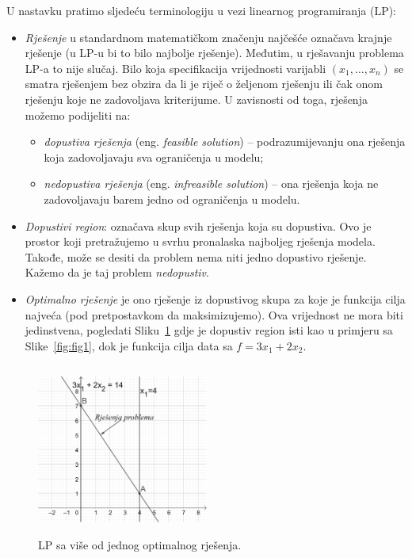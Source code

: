 \documentclass[a4paper, utf8, 11pt, colorlinks]{book}
\begin{document}
 U nastavku pratimo sljedeću terminologiju u vezi linearnog programiranja (LP):
\begin{itemize}
    \item \emph{Rješenje} u standardnom matematičkom značenju najčešće označava krajnje rješenje   (u LP-u bi to bilo najbolje rješenje). Međutim, u rješavanju problema LP-a to  nije slučaj. Bilo koja specifikacija vrijednosti varijabli  $(x_1,\ldots, x_n)$ se smatra rješenjem bez obzira da li je riječ o željenom rješenju ili čak onom rješenju koje ne zadovoljava kriterijume. U zavisnosti od toga, rješenja  možemo podijeliti na:
    \begin{itemize}
        \item \emph{dopustiva rješenja} (eng. \emph{feasible solution}) -- podrazumijevanju ona rješenja koja zadovoljavaju sva ograničenja u modelu;
        \item \emph{nedopustiva rješenja} (eng. \emph{infreasible solution}) -- ona rješenja koja ne zadovoljavaju barem jedno od ograničenja u modelu. 
    \end{itemize}
  \item \emph{Dopustivi region}: označava skup svih rješenja koja su dopustiva. Ovo je prostor koji pretražujemo u svrhu pronalaska najboljeg rješenja modela. Takođe, može se desiti da problem nema niti jedno dopustivo rješenje. Kažemo da je taj problem \emph{nedopustiv}. 
  \item \emph{Optimalno rješenje} je ono rješenje iz dopustivog skupa za koje je funkcija cilja najveća (pod pretpostavkom da maksimizujemo). Ova vrijednost ne mora biti jedinstvena, pogledati Sliku~\ref{fig:multi_solution} gdje je dopustiv region isti kao u primjeru sa Slike~\ref{fig:fig1}, dok je funkcija cilja data sa $f = 3x_1 + 2 x_2$.  
 \end{itemize}
 
 \begin{figure}
     \centering
     \includegraphics[width=160pt, height=160pt]{fig3.eps}
     \caption{LP sa više od jednog optimalnog rješenja.}
     \label{fig:multi_solution}
 \end{figure}
 
\end{document}
